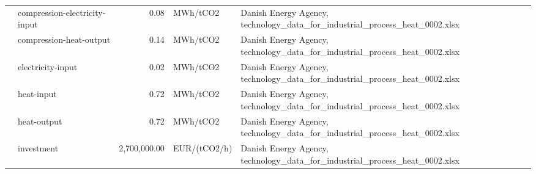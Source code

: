 \begin{longtable}{p{5cm}p{3cm}rp{3cm}p{11cm}}
                      & compression-electricity-input &           0.08 &                          MWh/tCO2 &                                                                                                                                                                                                                                                          Danish Energy Agency, technology\_data\_for\_industrial\_process\_heat\_0002.xlsx \\
                      & compression-heat-output &           0.14 &                          MWh/tCO2 &                                                                                                                                                                                                                                                          Danish Energy Agency, technology\_data\_for\_industrial\_process\_heat\_0002.xlsx \\
                      & electricity-input &           0.02 &                          MWh/tCO2 &                                                                                                                                                                                                                                                          Danish Energy Agency, technology\_data\_for\_industrial\_process\_heat\_0002.xlsx \\
                      & heat-input &           0.72 &                          MWh/tCO2 &                                                                                                                                                                                                                                                          Danish Energy Agency, technology\_data\_for\_industrial\_process\_heat\_0002.xlsx \\
                      & heat-output &           0.72 &                          MWh/tCO2 &                                                                                                                                                                                                                                                          Danish Energy Agency, technology\_data\_for\_industrial\_process\_heat\_0002.xlsx \\
                      & investment &   2,700,000.00 &                      EUR/(tCO2/h) &                                                                                                                                                                                                                                                          Danish Energy Agency, technology\_data\_for\_industrial\_process\_heat\_0002.xlsx \\

\end{longtable}
